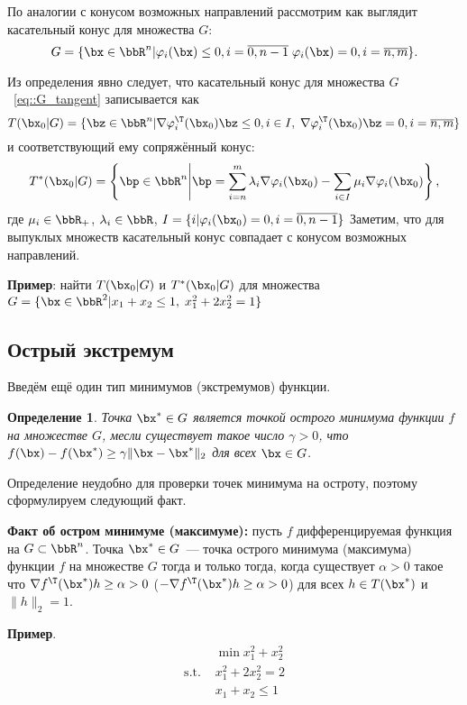 \documentclass[12pt]{article}
\newtheorem{Def}{ Определение}
\begin{document}
По аналогии с конусом возможных направлений рассмотрим как выглядит касательный конус для множества $G$:
\begin{equation}
G = \{\bx \in \bbR^n | \varphi_i(\bx) \leq 0, i = \overline{0, n-1} \; \varphi_i(\bx) = 0, i = \overline{n, m} \}.
\label{eq::G_tangent}
\end{equation}

Из определения явно следует, что касательный конус для множества $G$~\eqref{eq::G_tangent} записывается как
\[
T(\bx_0|G) = \{ \bz \in \bbR^n | \nabla \varphi^{\T}_i(\bx_0)\bz \leq 0, i \in I, \; \nabla \varphi^{\T}_i(\bx_0)\bz = 0, i = \overline{n,m} \}
\]
и соответствующий ему сопряжённый конус:
\[
T^*(\bx_0|G) = \left \{ \bp \in \bbR^n \middle| \bp = \sum\limits_{i = n}^m \lambda_i \nabla \varphi_i(\bx_0) - \sum\limits_{i \in I} \mu_i \nabla \varphi_i(\bx_0) \right \},
\] 
где $\mu_i \in \bbR_+$, $\lambda_i \in \bbR$, $I = \{i | \varphi_i(\bx_0) = 0, i = \overline{0, n-1} \}$
Заметим, что для выпуклых множеств касательный конус совпадает с конусом возможных направлений.

\textbf{Пример}: найти $T(\bx_0|G)$ и $T^*(\bx_0|G)$ для множества $G = \{\bx \in \bbR^2 | x_1 + x_2 \leq 1, \; x^2_1 + 2x_2^2 = 1 \}$


\subsection{Острый экстремум}

Введём ещё один тип минимумов (экстремумов) функции.
\begin{Def}
Точка $\bx^* \in G$ является точкой острого минимума функции $f$ на множестве $G$, месли существует такое число $\gamma > 0$, что $f(\bx) - f(\bx^*) \geq \gamma \|\bx - \bx^*\|_2$ для всех $\bx \in G$.
\end{Def}

Определение неудобно для проверки точек минимума на остроту, поэтому сформулируем следующий факт.

\textbf{Факт об остром минимуме (максимуме):} пусть $f$ дифференцируемая функция на $G \subset \bbR^n$. 
Точка $\bx^* \in G$~--- точка острого минимума (максимума) функции $f$ на множестве $G$ тогда и только тогда, когда существует $\alpha > 0$ такое что $\nabla f^{\T}(\bx^*) h \geq \alpha > 0$ ($-\nabla f^{\T}(\bx^*) h \geq \alpha > 0$) для всех $h \in T(\bx^*)$ и $\|h\|_2 = 1$.  

\textbf{Пример}.
\begin{equation}
\begin{split}
& \min x_1^2 + x_2^2\\
\text{s.t. } & x_1^2 + 2x_2^2 = 2\\
& x_1 + x_2 \leq 1
\end{split}
\label{eq::sharp_extr}
\end{equation}
\end{document}
